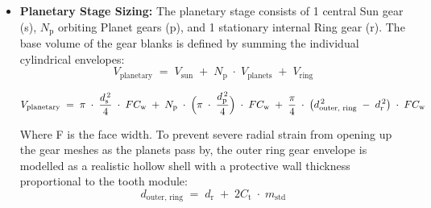 \begin{itemize}
                \item \textbf{Planetary Stage Sizing:}
                The planetary stage consists of 1 central Sun gear (s), $N_{\text{p}}$ orbiting Planet gears (p), 
                and 1 stationary internal Ring gear (r). The base volume of the gear blanks is defined by summing 
                the individual cylindrical envelopes:
                    \begin{equation}
                        \label{eq:volumeplanetarya}
                        V_{\text{planetary}}
                        \;=\;
                        V_{\text{sun}}
                        \;+\;
                        N_{\text{p}}   \;\cdot\; V_{\text{planets}}
                        \;+\;
                        V_{\text{ring}}
                    \end{equation}

                    \begin{equation}
                        \label{eq:volumeplanetaryb}
                        V_{\text{planetary}}
                        \;=\;
                        \pi\;\cdot\;\frac{d_{\text{s}}^{\,2}}{4}\;\cdot\;FC_{\text{w}}
                        \;+\;
                        N_{\text{p}}\;\cdot\;\Bigl(\pi\;\cdot\;\frac{d_{\text{p}}^{\,2}}{4}\Bigr)\;\cdot\;FC_{\text{w}}
                        \;+\;
                        \frac{\pi}{4}\;\cdot\;\bigl(d_{\text{outer, ring}}^{\,2}\;-\;d_{\text{r}}^{\,2}\bigr)\;\cdot\;FC_{\text{w}}
                    \end{equation}

                Where F is the face width. To prevent severe radial strain from opening up the gear meshes as the planets pass by, 
                the outer ring gear envelope is modelled as a realistic hollow shell with a protective wall thickness proportional 
                to the tooth module:
                    \begin{equation}
                        \label{eq:outerringdia}
                        d_{\text{outer, ring}}
                        \;=\;
                        d_{\text{r}}
                        \;+\;
                        2C_{\text{t}}\;\cdot\;m_{\text{std}}
                    \end{equation}


\end{itemize}
